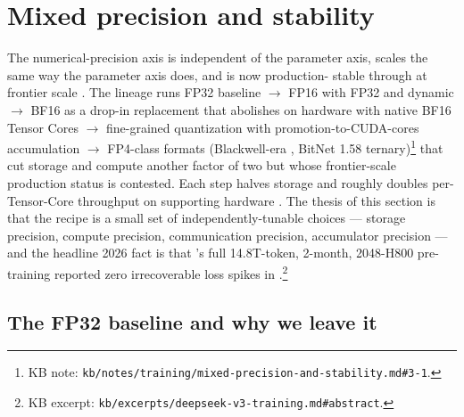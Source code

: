 
\section{Mixed precision and stability}
\label{sec:mixed-precision}

The numerical-precision axis is independent of the parameter axis,
scales the same way the parameter axis does, and is now production-
stable through  at frontier scale \citep[\S 3.3]{deepseek-v3}.
The lineage runs FP32 baseline $\to$ FP16 with FP32  and
dynamic  \citep{micikevicius2017-mixed-precision}
$\to$ BF16 as a drop-in replacement that abolishes  on
hardware with native BF16 Tensor Cores \citep{kalamkar2019-bfloat16}
$\to$  fine-grained quantization with promotion-to-CUDA-cores
accumulation \citep[\S 3.3]{deepseek-v3} $\to$ FP4-class formats
(Blackwell-era , BitNet 1.58 ternary)\footnote{KB note:
\nolinkurl{kb/notes/training/mixed-precision-and-stability.md#3-1}.} that
cut storage and compute another factor of two but whose frontier-scale
production status is contested. Each step halves storage and roughly
doubles per-Tensor-Core throughput on supporting hardware
\citep[\S 3.3]{deepseek-v3}. The thesis of this section is that the
recipe is a small set of independently-tunable choices — storage
precision, compute precision, communication precision, accumulator
precision — and the headline 2026 fact is that 's full
14.8T-token, 2-month, 2048-H800 pre-training reported zero
irrecoverable loss spikes in 
\citep[abstract]{deepseek-v3}.\footnote{KB excerpt:
\nolinkurl{kb/excerpts/deepseek-v3-training.md#abstract}.}

\subsection{The FP32 baseline and why we leave it}
\label{sec:mp-fp32}

